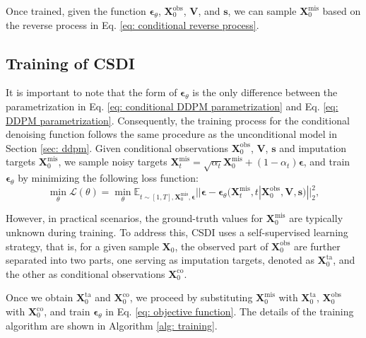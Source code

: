 \documentclass[11pt]{article}
\begin{document}
Once trained, given the function $\bm{\epsilon}_{\theta}$, $\bm{X}_0^{\mathrm{obs}}$, $\bm{V}$, and $\bm{s}$, we can sample $\bm{X}_0^{\mathrm{mis}}$ based on the reverse process in Eq. \ref{eq: conditional reverse process}. 

\subsection{Training of CSDI}\label{sec: training of csdi}
It is important to note that the form of $\bm{\epsilon}_{\theta}$ is the only difference between the parametrization in Eq. \ref{eq: conditional DDPM parametrization} and Eq. \ref{eq: DDPM parametrization}. Consequently, the training process for the conditional denoising function follows the same procedure as the unconditional model in Section \ref{sec: ddpm}. Given conditional observations $\bm{X}_0^{\mathrm{obs}}$, $\bm{V}$, $\bm{s}$ and imputation targets $\bm{X}_0^{\mathrm{mis}}$, we sample noisy targets $\bm{X}_t^{\mathrm{mis}}=\sqrt{\alpha_t}\bm{X}_0^{\mathrm{mis}}+(1-\alpha_t)\bm{\epsilon}$, and train $\bm{\epsilon}_{\theta}$ by minimizing the following loss function:
\begin{equation}\label{eq: objective function}
	\min_{\theta}\mathcal{L}(\theta)=\min_{\theta}\mathbb{E}_{t\sim [1,T],\bm{X}_0^{\mathrm{mis}},\bm{\epsilon}}||\bm{\epsilon}-\bm{\epsilon}_{\theta}(\bm{X}_t^{\mathrm{mis}}, t|\bm{X}_0^{\mathrm{obs}},\bm{V},\bm{s})||^2_2,
\end{equation}


However, in practical scenarios, the ground-truth values for $\bm{X}_0^{\mathrm{mis}}$ are typically unknown during training. To address this, CSDI uses a self-supervised learning strategy, that is, for a given sample $\bm{X}_0$, the observed part of $\bm{X}_0^{\mathrm{obs}}$ are further separated into two parts, one serving as imputation targets, denoted as $\bm{X}_0^{\mathrm{ta}}$, and the other as conditional observations $\bm{X}_0^{\mathrm{co}}$. 


Once we obtain $\bm{X}_0^{\mathrm{ta}}$ and $\bm{X}_0^{\mathrm{co}}$, we proceed by substituting $\bm{X}_0^{\mathrm{mis}}$ with $\bm{X}_0^{\mathrm{ta}}$, $\bm{X}_0^{\mathrm{obs}}$ with $\bm{X}_0^{\mathrm{co}}$,  and train $\bm{\epsilon}_{\theta}$ in Eq. \ref{eq: objective function}. The details of the training algorithm are shown in Algorithm \ref{alg: training}.
\end{document}
